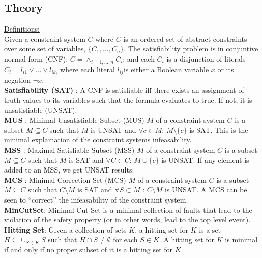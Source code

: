 \subsection{Theory}
\underline{Definitions:} \\

Given a constraint system $C$ where $C$ is an ordered set of abstract constraints over some set of variables, $\{C_1, ..., C_n\}$. The satisfiability problem is in conjuntive normal form (CNF): $C = \land_{i=1,...,n} C_i$; and each $C_i$ is a disjunction of literals $C_i = l_{i1} \lor ... \lor l_{ik_i}$ where each literal $ l_{ij}$is either a Boolean variable $x$ or its negation $\neg x$. \\

\textbf{Satisfiability (SAT)} : A CNF is satisfiable iff there exists an assignment of truth values to its variables such that the formula evaluates to true. If not, it is unsatisfiable (UNSAT). \\

\textbf{MUS} : Minimal Unsatisfiable Subset (MUS) $M$ of a constraint system $C$ is a subset $M \subseteq C$ such that $M$ is UNSAT and $\forall c \in M$: $M \setminus \{c\}$ is SAT. This is the minimal explaination of the constraint systems infeasability. \\

\textbf{MSS} : Maximal Satisfiable Subset (MSS) $M$ of a constraint system $C$ is a subset $M \subseteq C$ such that $M$ is SAT and $\forall C \in C$: $M \cup \{c\}$ is UNSAT. If any element is added to an MSS, we get UNSAT results. \\

\textbf{MCS} : Minimal Correction Set (MCS) $M$ of a constraint system $C$ is a subset $M \subseteq C$ such that $C \setminus M$ is SAT and $\forall S \subset M$ : $C \setminus M$ is UNSAT. A MCS can be seen to ``correct'' the infeasability of the constraint system.\\

\textbf{MinCutSet}: Minimal Cut Set is a minimal collection of faults that lead to the violation of the safety property (or in other words, lead to the top level event). \\

\textbf{Hitting Set}: Given a collection of sets $K$, a hitting set for $K$ is a set $H \subseteq \cup_{S \in K} S$ such that $H \cap S \neq \emptyset$ for each $S  \in K$. A hitting set for $K$ is minimal if and only if no proper subset of it is a hitting set for $K$. \\

